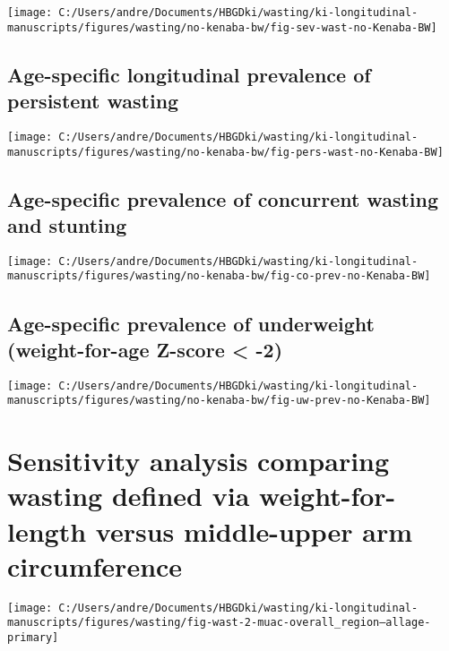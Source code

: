 \documentclass[
  9pt,
]{book}
\begin{document}
\texttt{[image: C:/Users/andre/Documents/HBGDki/wasting/ki-longitudinal-manuscripts/figures/wasting/no-kenaba-bw/fig-sev-wast-no-Kenaba-BW]}

\hypertarget{age-specific-longitudinal-prevalence-of-persistent-wasting-2}{%
\section{Age-specific longitudinal prevalence of persistent wasting}\label{age-specific-longitudinal-prevalence-of-persistent-wasting-2}}

\texttt{[image: C:/Users/andre/Documents/HBGDki/wasting/ki-longitudinal-manuscripts/figures/wasting/no-kenaba-bw/fig-pers-wast-no-Kenaba-BW]}

\hypertarget{age-specific-prevalence-of-concurrent-wasting-and-stunting-2}{%
\section{Age-specific prevalence of concurrent wasting and stunting}\label{age-specific-prevalence-of-concurrent-wasting-and-stunting-2}}

\texttt{[image: C:/Users/andre/Documents/HBGDki/wasting/ki-longitudinal-manuscripts/figures/wasting/no-kenaba-bw/fig-co-prev-no-Kenaba-BW]}

\hypertarget{age-specific-prevalence-of-underweight-weight-for-age-z-score--2-1}{%
\section{Age-specific prevalence of underweight (weight-for-age Z-score \textless{} -2)}\label{age-specific-prevalence-of-underweight-weight-for-age-z-score--2-1}}

\texttt{[image: C:/Users/andre/Documents/HBGDki/wasting/ki-longitudinal-manuscripts/figures/wasting/no-kenaba-bw/fig-uw-prev-no-Kenaba-BW]}

\hypertarget{muac}{%
\chapter{Sensitivity analysis comparing wasting defined via weight-for-length versus middle-upper arm circumference}\label{muac}}

\raggedright

\texttt{[image: C:/Users/andre/Documents/HBGDki/wasting/ki-longitudinal-manuscripts/figures/wasting/fig-wast-2-muac-overall\_region--allage-primary]}
\end{document}
